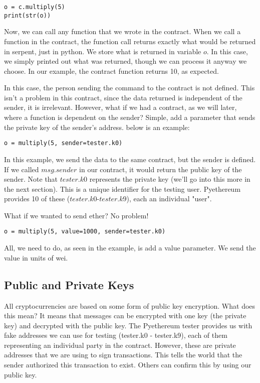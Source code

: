 \documentclass[12pt]{article}
\begin{document}
\begin{verbatim}
o = c.multiply(5)
print(str(o))
\end{verbatim}

Now, we can call any function that we wrote in the contract. When we call a function in the contract, the function call returns exactly what would be returned in serpent, just in python. We store what is returned in variable $o$. In this case, we simply printed out what was returned, though we can process it anyway we choose. In our example, the contract function returns 10, as expected.

In this case, the person sending the command to the contract is not defined. This isn't a problem in this contract, since the data returned is independent of the sender, it is irrelevant. However, what if we had a contract, as we will later, where a function is dependent on the sender? Simple, add a parameter that sends the private key of the sender's address. below is an example:

\begin{verbatim}
o = multiply(5, sender=tester.k0)
\end{verbatim}

In this example, we send the data to the same contract, but the sender is defined. If we called $msg.sender$ in our contract, it would return the public key of the sender. Note that $tester.k0$ represents the private key (we'll go into this more in the next section). This is a unique identifier for the testing user. Pyethereum provides 10 of these ($tester.k0$-$tester.k9$), each an individual "user".

What if we wanted to send ether? No problem! 
\begin{verbatim}
o = multiply(5, value=1000, sender=tester.k0)
\end{verbatim}

All, we need to do, as seen in the example, is add a value parameter. We send the value in units of wei.

\cite{test_contracts.py,Usingpyethereum.tester}

\subsection{Public and Private Keys}
All cryptocurrencies are based on some form of public key encryption. What does this mean? It means that messages can be encrypted with one key (the private key) and decrypted with the public key. The Pyethereum tester provides us with fake addresses we can use for testing (tester.k0 - tester.k9), each of them representing an individual party in the contract. However, these are private addresses that we are using to sign transactions. This tells the world that the sender authorized this transaction to exist. Others can confirm this by using our public key. 
\end{document}
